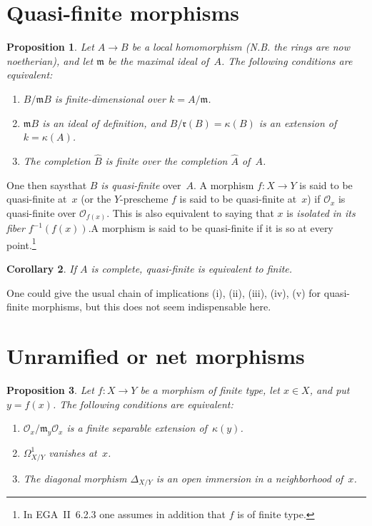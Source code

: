 \documentclass[11pt,oneside]{amsbook}
\newtheorem{proposition}{Proposition}[section]
\newtheorem{corollary}[proposition]{Corollary}
\theoremstyle{remark}
\theoremstyle{plain}
\numberwithin{equation}{section}
\begin{document}
\section{Quasi-finite morphisms}
\label{I.2}

\begin{proposition}
\label{I.2.1}
Let \(A\to B\) be a local homomorphism (N.B. the rings are now
noetherian), and let \(\mathfrak m\) be the maximal ideal of~\(A\).  The
following conditions are equivalent:
\begin{enumerate}
\item[(i)] \(B/\mathfrak mB\) is finite-dimensional over
  \(k=A/\mathfrak m\).
\item[(ii)] \(\mathfrak mB\) is an ideal of definition, and
  \(B/\mathfrak r(B)=\kappa(B)\) is an extension of
  \(k=\kappa(A)\).
\item[(iii)] The completion \(\widehat B\) is finite over the completion
  \(\widehat A\) of~\(A\).
\end{enumerate}
\end{proposition}

One then saysthat
\(B\) \emph{is quasi-finite} over~\(A\).  A morphism
\(f\colon X\to Y\) is said to be quasi-finite at~\(x\) (or the
\(Y\)-prescheme \(f\) is said to be quasi-finite at~\(x\)) if
\(\mathcal O_x\) is quasi-finite over \(\mathcal O_{f(x)}\).  This is also
equivalent to saying that \(x\) is \emph{isolated in its fiber}
\(f^{-1}(f(x))\).A morphism is said to be quasi-finite if it is so at
every point.\footnote{In EGA~II~6.2.3 one assumes in addition that \(f\) is
of finite type.}

\begin{corollary}
\label{I.2.2}
If \(A\) is complete, quasi-finite is equivalent to finite.
\end{corollary}

One could give the usual chain of implications \textup{(i), (ii), (iii),
(iv), (v)} for quasi-finite morphisms, but this does not seem indispensable
here.


\section{Unramified or net morphisms}
\label{I.3}

\begin{proposition}
\label{I.3.1}
Let \(f\colon X\to Y\) be a morphism of finite type, let \(x\in X\), and
put \(y=f(x)\).  The following conditions are equivalent:
\begin{enumerate}
\item[(i)] 
  \(\mathcal O_x/\mathfrak m_y\mathcal O_x\) is a finite separable
  extension of~\(\kappa(y)\).
\item[(ii)] \(\Omega^1_{X/Y}\) vanishes at~\(x\).
\item[(iii)] The diagonal morphism \(\Delta_{X/Y}\) is an open immersion
  in a neighborhood of~\(x\).
\end{enumerate}
\end{proposition}
\end{document}
